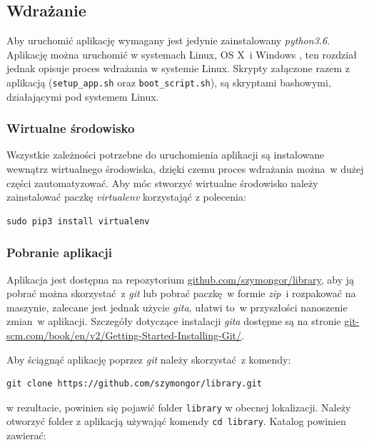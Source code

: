 \documentclass[twoside]{projektInzynierskiMS}
\begin{document}
\subsection{Wdrażanie}
Aby uruchomić aplikację wymagany jest jedynie zainstalowany \textit{python3.6}. Aplikację można uruchomić w systemach Linux, OS X~i Windows \cite[s. 140]{djangobook}, ten rozdział jednak opisuje proces wdrażania w systemie Linux. Skrypty załączone razem z aplikacją (\verb`setup_app.sh` oraz \verb`boot_script.sh`), są skryptami bashowymi, działającymi pod systemem Linux. 

\subsubsection{Wirtualne środowisko}
Wszystkie zależności potrzebne do uruchomienia aplikacji są instalowane wewnątrz wirtualnego środowiska, dzięki czemu proces wdrażania można~w dużej części zautomatyzować. Aby móc stworzyć wirtualne środowisko należy zainstalować paczkę \textit{virtualenv} korzystająć z polecenia:
\begin{verbatim}
sudo pip3 install virtualenv
\end{verbatim}


\subsubsection{Pobranie aplikacji}

Aplikacja jest dostępna na repozytorium \href{https://github.com/szymongor/library}{github.com/szymongor/library}, aby ją pobrać można skorzystać~z \textit{git} lub pobrać paczkę~w formie \textit{zip}~i rozpakować na maszynie, zalecane jest jednak użycie \textit{gita}, ułatwi to~w przyszłości nanoszenie zmian~w aplikacji. Szczegóły dotyczące instalacji \textit{gita} dostępne są na stronie \href{https://git-scm.com/book/en/v2/Getting-Started-Installing-Git/}{git-scm.com/book/en/v2/Getting-Started-Installing-Git/}. 

Aby ściągnąć aplikację poprzez \textit{git} należy skorzystać~z komendy:

\begin{verbatim}
git clone https://github.com/szymongor/library.git
\end{verbatim}
w rezultacie, powinien się pojawić folder \verb`library` w obecnej lokalizacji. Należy otworzyć folder z aplikacją używająć komendy \verb`cd library`. Katalog powinien zawierać:
\end{document}
